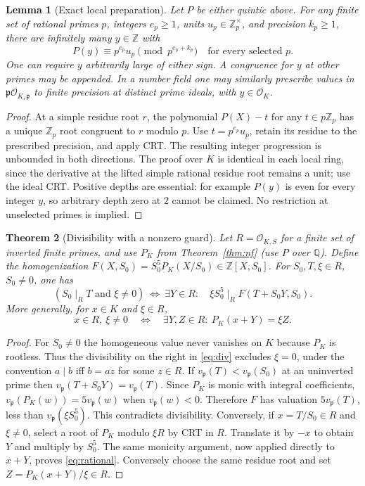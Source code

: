 \documentclass[11pt]{article}
\newtheorem{theorem}{Theorem}[section]
\newtheorem{lemma}[theorem]{Lemma}
\newcommand{\Q}{\mathbb Q}\newcommand{\Z}{\mathbb Z}\newcommand{\N}{\mathbb N}
\newcommand{\OK}{\mathcal O_K}\newcommand{\vp}{v_p}\newcommand{\Sp}{\operatorname{Spec}}
\begin{document}
\begin{lemma}[Exact local preparation]\label{lem:exact}
Let $P$ be either quintic above. For any finite set of rational primes
$p$, integers $e_p\ge1$, units $u_p\in\Z_p^\times$, and precision
$k_p\ge1$, there are infinitely many $y\in\Z$ with
\[
 P(y)\equiv p^{e_p}u_p\pmod {p^{e_p+k_p}}\quad\text{for every selected }p.
\]
One can require $y$ arbitrarily large of either sign. A congruence for
$y$ at other primes may be appended. In a number field one may similarly
prescribe values in $\mathfrak p\mathcal O_{K,\mathfrak p}$ to finite
precision at distinct prime ideals, with $y\in\OK$.
\end{lemma}
\begin{proof}
At a simple residue root $r$, the polynomial $P(X)-t$ for any
$t\in p\Z_p$ has a unique $\Z_p$ root congruent to $r$ modulo $p$.
Use $t=p^{e_p}u_p$, retain its residue to the prescribed precision,
and apply CRT. The resulting integer progression is unbounded in
both directions. The proof over $K$ is identical in each local ring,
since the derivative at the lifted simple rational residue root
remains a unit; use the ideal CRT. Positive depths are essential:
for example $P(y)$ is even for every integer $y$, so arbitrary depth
zero at 2 cannot be claimed. No restriction at unselected primes is
implied.
\end{proof}

\begin{theorem}[Divisibility with a nonzero guard]\label{thm:div}
Let $R=\mathcal O_{K,S}$ for a finite set of inverted finite primes,
and use $P_K$ from Theorem~\ref{thm:nf} (use $P$ over $\Q$). Define the
homogenization $F(X,S_0)=S_0^5P_K(X/S_0)\in\Z[X,S_0]$. For
$S_0,T,\xi\in R$, $S_0\ne0$, one has
\begin{equation}\label{eq:div}
 (S_0\mid_R T\text{ and }\xi\ne0)
 \ \Longleftrightarrow\ \exists Y\in R:\quad
 \xi S_0^5\mid_R F(T+S_0Y,S_0).
\end{equation}
More generally, for $x\in K$ and $\xi\in R$,
\begin{equation}\label{eq:rational}
 x\in R,\ \xi\ne0
 \quad\Longleftrightarrow\quad
 \exists Y,Z\in R:\ P_K(x+Y)=\xi Z.
\end{equation}
\end{theorem}
\begin{proof}
For $S_0\ne0$ the homogeneous value never vanishes on $K$ because
$P_K$ is rootless. Thus the divisibility on the right in \eqref{eq:div}
excludes $\xi=0$, under the convention $a\mid b$ iff $b=az$ for
some $z\in R$. If $v_\mathfrak p(T)<v_\mathfrak p(S_0)$ at an uninverted
prime then $v_\mathfrak p(T+S_0Y)=v_\mathfrak p(T)$. Since $P_K$ is monic
with integral coefficients, $v_\mathfrak p(P_K(w))=5v_\mathfrak p(w)$
when $v_\mathfrak p(w)<0$. Therefore $F$ has valuation
$5v_\mathfrak p(T)$, less than $v_\mathfrak p(\xi S_0^5)$. This
contradicts divisibility. Conversely, if $x=T/S_0\in R$ and
$\xi\ne0$, select a root of $P_K$ modulo $\xi R$ by CRT in $R$.
Translate it by $-x$ to obtain $Y$ and multiply by $S_0^5$.
The same monicity argument, now applied directly to $x+Y$, proves
\eqref{eq:rational}. Conversely choose the same residue root and set
$Z=P_K(x+Y)/\xi\in R$.
\end{proof}
\end{document}
